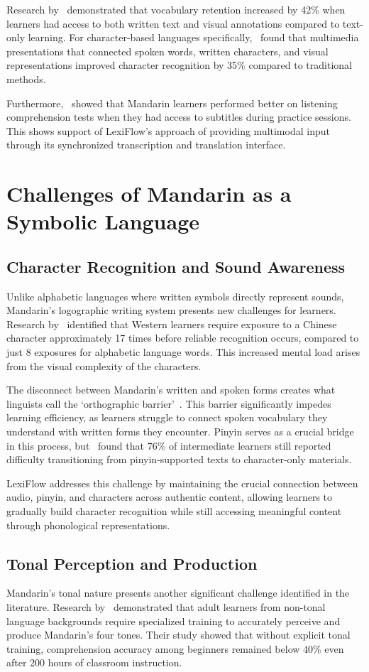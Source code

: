 \documentclass[oneside]{utmthesis}
\begin{document}
Research by~\citet{jones2002} demonstrated that vocabulary retention increased by 42\% when learners had access to both written text and visual annotations compared to text-only learning. For character-based languages specifically,~\citet{shen2010} found that multimedia presentations that connected spoken words, written characters, and visual representations improved character recognition by 35\% compared to traditional methods.

Furthermore,~\citet{li2022} showed that Mandarin learners performed better on listening comprehension tests when they had access to subtitles during practice sessions. This shows support of LexiFlow's approach of providing multimodal input through its synchronized transcription and translation interface.
\section{Challenges of Mandarin as a Symbolic Language}
\subsection{Character Recognition and Sound Awareness}
Unlike alphabetic languages where written symbols directly represent sounds, Mandarin's logographic writing system presents new challenges for learners. Research by~\citet{everson2011} identified that Western learners require exposure to a Chinese character approximately 17 times before reliable recognition occurs, compared to just 8 exposures for alphabetic language words. This increased mental load arises from the visual complexity of the characters.

The disconnect between Mandarin's written and spoken forms creates what linguists call the `orthographic barrier'~\citep{shen2007}. This barrier significantly impedes learning efficiency, as learners struggle to connect spoken vocabulary they understand with written forms they encounter. Pinyin serves as a crucial bridge in this process, but~\citet{ye2013} found that 76\% of intermediate learners still reported difficulty transitioning from pinyin-supported texts to character-only materials.

LexiFlow addresses this challenge by maintaining the crucial connection between audio, pinyin, and characters across authentic content, allowing learners to gradually build character recognition while still accessing meaningful content through phonological representations.
\subsection{Tonal Perception and Production}
Mandarin's tonal nature presents another significant challenge identified in the literature. Research by~\citet{wang1999} demonstrated that adult learners from non-tonal language backgrounds require specialized training to accurately perceive and produce Mandarin's four tones. Their study showed that without explicit tonal training, comprehension accuracy among beginners remained below 40\% even after 200 hours of classroom instruction.
\end{document}
